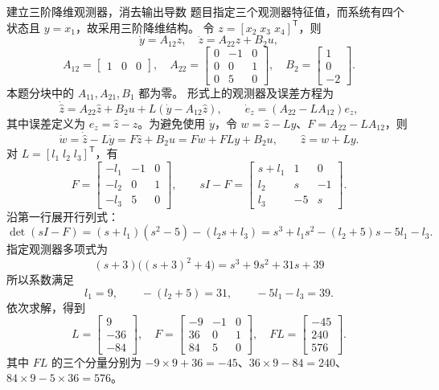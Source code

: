 \documentclass[11pt]{article}
\begin{document}
\begin{solution}
\begin{proofstep}{建立三阶降维观测器，消去输出导数}
题目指定三个观测器特征值，而系统有四个状态且 $y=x_1$，故采用三阶降维结构。
令 $z=[x_2\;x_3\;x_4]^{\mathsf T}$，则
\[
 \dot y=A_{12}z,\quad \dot z=A_{22}z+B_2u,
\]
\[
 A_{12}=\begin{bmatrix}1&0&0\end{bmatrix},\quad
 A_{22}=\begin{bmatrix}0&-1&0\\0&0&1\\0&5&0\end{bmatrix},\quad
 B_2=\begin{bmatrix}1\\0\\-2\end{bmatrix}.
\]
本题分块中的 $A_{11},A_{21},B_1$ 都为零。
形式上的观测器及误差方程为
\[
 \dot{\hat z}=A_{22}\hat z+B_2u+L(\dot y-A_{12}\hat z),
 \qquad \dot e_z=(A_{22}-LA_{12})e_z,
\]
其中误差定义为 $e_z=\hat z-z$。为避免使用 $\dot y$，令
$w=\hat z-Ly$、$F=A_{22}-LA_{12}$，则
\[
 \dot w=\dot{\hat z}-L\dot y=F\hat z+B_2u
 =Fw+FLy+B_2u,\qquad \hat z=w+Ly.
\]
对 $L=[l_1\;l_2\;l_3]^{\mathsf T}$，有
\[
 F=\begin{bmatrix}-l_1&-1&0\\-l_2&0&1\\-l_3&5&0\end{bmatrix},
 \qquad sI-F=\begin{bmatrix}s+l_1&1&0\\l_2&s&-1\\l_3&-5&s\end{bmatrix}.
\]
沿第一行展开行列式：
\[
 \det(sI-F)=(s+l_1)(s^2-5)-(l_2s+l_3)
 =s^3+l_1s^2-(l_2+5)s-5l_1-l_3.
\]
指定观测器多项式为
\[
 (s+3)\bigl((s+3)^2+4\bigr)=s^3+9s^2+31s+39
\]
所以系数满足
\[
 l_1=9,\qquad -(l_2+5)=31,\qquad -5l_1-l_3=39.
\]
依次求解，得到
\[
 L=\begin{bmatrix}9\\-36\\-84\end{bmatrix},\quad
 F=\begin{bmatrix}-9&-1&0\\36&0&1\\84&5&0\end{bmatrix},\quad
 FL=\begin{bmatrix}-45\\240\\576\end{bmatrix}.
\]
其中 $FL$ 的三个分量分别为
$-9\times9+36=-45$、$36\times9-84=240$、$84\times9-5\times36=576$。

\end{proofstep}
\end{solution}
\end{document}
